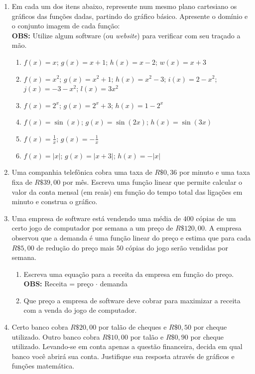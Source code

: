 \documentclass[oneside,a4paper,12pt]{article}
\begin{document}
\begin{enumerate}
	\item Em cada um dos itens abaixo, represente num mesmo plano cartesiano os gráficos das funções dadas, partindo do gráfico básico. Apresente o domínio e o conjunto imagem de cada função:
	\\ {\bf OBS:} Utilize algum software (ou {\it website}) para verificar com seu traçado a mão.
	\begin{enumerate}
		\item $f(x) = x$; $g(x) = x +1$; $h(x) = x -2$; $w(x) = x+3$
		\item $f(x) = x^2$; $g(x) = x^2 +1$; $h(x) = x^2 - 3$; $i(x) = 2 - x^2$; $j(x) = -3 -x^2$; $l(x) = 3x^2$
		\item $f(x) = 2^x$; $g(x)=2^x + 3$; $h(x) = 1 - 2^x$
		\item $f(x) = \sin(x)$; $g(x) = \sin(2x)$; $h(x) = \sin(3x)$
		\item $f(x) = \frac{1}{x}$; $g(x) = - \frac{1}{x}$
		\item $f(x) = |x|$;  $g(x) = |x+3|$; $h(x) = -|x|$
	\end{enumerate}


	\item Uma companhia telefônica cobra uma taxa de $R\$ 0,36$ por minuto e uma taxa fixa de $R\$ 39,00$ por mês. Escreva uma função linear que permite calcular o valor da conta mensal (em reais) em função do tempo total das ligações em minuto e construa o gráfico.

	\item Uma empresa de software está vendendo uma média de $400$ cópias de um certo jogo de computador por semana a um preço de $R\$ 120,00$. A empresa observou que a demanda é uma função linear do preço e estima que para cada $R\$ 5,00$ de redução do preço mais $50$ cópias do jogo serão vendidas por semana.
	\begin{enumerate}
		\item Escreva uma equação para a receita da empresa em função do preço. \\ {\bf OBS:} Receita = preço $\cdot$ demanda
		\item Que preço a empresa de software deve cobrar para maximizar a receita com a venda do jogo de computador.
	\end{enumerate}

	\item Certo banco cobra $R\$ 20,00$ por talão de cheques e $R\$ 0,50$ por cheque utilizado. Outro banco cobra $R\$10,00$ por talão e $R\$0,90$ por cheque utilizado. Levando-se em conta apenas a questão financeira, decida em qual banco você abrirá sua conta. Justifique sua resposta através de gráficos e funções matemática.



\end{enumerate}
\end{document}
